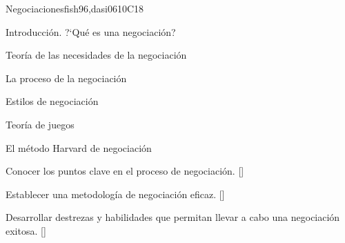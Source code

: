\begin{syllabus}
\begin{unit}{}{Negociaciones}{fish96,dasi06}{10}{C18}
\begin{topics}
      \item Introducción. ?`Qué es una negociación?
      \item Teoría de las necesidades de la negociación
      \item La proceso de la negociación
      \item Estilos de negociación
      \item Teoría de juegos
      \item El método Harvard de negociación
   \end{topics}
   \begin{learningoutcomes}
      \item Conocer los puntos clave en el proceso de negociación. [\Usage]
      \item Establecer una metodología de negociación eficaz. [\Usage]
      \item Desarrollar destrezas y habilidades que permitan llevar a cabo una negociación exitosa. [\Usage]
   \end{learningoutcomes}
\end{unit}




\begin{coursebibliography}
\end{coursebibliography}

\end{syllabus}

%

